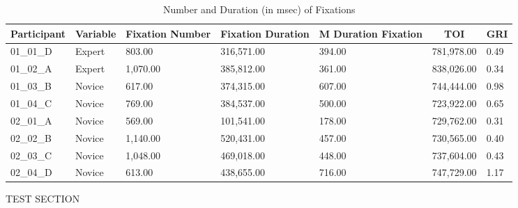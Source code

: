 \documentclass[
  english,
  man,floatsintext]{apa6}
\begin{document}
\begin{table}[h]

\begin{center}
\begin{threeparttable}

\caption{\label{tab:GRItable}Number and Duration (in msec) of Fixations}

\scriptsize{

\begin{tabular}{lllllll}
\toprule
Participant & \multicolumn{1}{c}{Variable} & \multicolumn{1}{c}{Fixation Number} & \multicolumn{1}{c}{Fixation Duration} & \multicolumn{1}{c}{M Duration Fixation} & \multicolumn{1}{c}{TOI} & \multicolumn{1}{c}{GRI}\\
\midrule
01\_01\_D & Expert & 803.00 & 316,571.00 & 394.00 & 781,978.00 & 0.49\\
01\_02\_A & Expert & 1,070.00 & 385,812.00 & 361.00 & 838,026.00 & 0.34\\
01\_03\_B & Novice & 617.00 & 374,315.00 & 607.00 & 744,444.00 & 0.98\\
01\_04\_C & Novice & 769.00 & 384,537.00 & 500.00 & 723,922.00 & 0.65\\
02\_01\_A & Novice & 569.00 & 101,541.00 & 178.00 & 729,762.00 & 0.31\\
02\_02\_B & Novice & 1,140.00 & 520,431.00 & 457.00 & 730,565.00 & 0.40\\
02\_03\_C & Novice & 1,048.00 & 469,018.00 & 448.00 & 737,604.00 & 0.43\\
02\_04\_D & Novice & 613.00 & 438,655.00 & 716.00 & 747,729.00 & 1.17\\
\bottomrule
\end{tabular}

}

\end{threeparttable}
\end{center}

\end{table}

TEST SECTION
\end{document}
